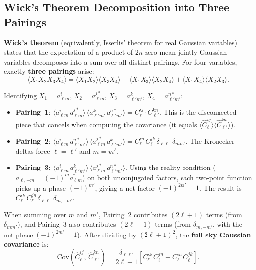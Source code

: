 \documentclass[10pt,a4paper]{article}
\newcommand{\Cl}{C_\ell}
\begin{document}
\subsection{Wick's Theorem Decomposition into Three Pairings}

\textbf{Wick's theorem} (equivalently, Isserlis' theorem for real Gaussian variables) states that the expectation of a product of $2n$ zero-mean jointly Gaussian variables decomposes into a sum over all distinct pairings. For four variables, exactly \textbf{three pairings} arise:
\begin{equation}
\langle X_1 X_2 X_3 X_4 \rangle
= \langle X_1 X_2 \rangle \langle X_3 X_4 \rangle
+ \langle X_1 X_3 \rangle \langle X_2 X_4 \rangle
+ \langle X_1 X_4 \rangle \langle X_2 X_3 \rangle.
\end{equation}

Identifying $X_1 = a_{\ell m}^i$, $X_2 = a_{\ell m}^{j*}$, $X_3 = a_{\ell' m'}^k$, $X_4 = a_{\ell' m'}^{n*}$:

\begin{itemize}[leftmargin=2em]
\item \textbf{Pairing~1}: $\langle a_{\ell m}^i\, a_{\ell m}^{j*}\rangle\, \langle a_{\ell' m'}^k\, a_{\ell' m'}^{n*}\rangle = \Cl^{ij} \cdot C_{\ell'}^{kn}$. This is the disconnected piece that cancels when computing the covariance (it equals $\langle \hat{C}_\ell^{ij}\rangle \langle \hat{C}_{\ell'}^{kn}\rangle$).

\item \textbf{Pairing~2}: $\langle a_{\ell m}^i\, a_{\ell' m'}^{n*}\rangle\, \langle a_{\ell m}^{j*}\, a_{\ell' m'}^k\rangle = \Cl^{in}\, \Cl^{jk}\, \delta_{\ell\ell'}\, \delta_{mm'}$. The Kronecker deltas force $\ell = \ell'$ and $m = m'$.

\item \textbf{Pairing~3}: $\langle a_{\ell m}^i\, a_{\ell' m'}^k\rangle\, \langle a_{\ell m}^{j*}\, a_{\ell' m'}^{n*}\rangle$. Using the reality condition ($a_{\ell,-m} = (-1)^m a_{\ell m}^*$) on both unconjugated factors, each two-point function picks up a phase $(-1)^{m'}$, giving a net factor $(-1)^{2m'} = 1$. The result is $\Cl^{ik}\, \Cl^{jn}\, \delta_{\ell\ell'}\, \delta_{m,-m'}$.
\end{itemize}

When summing over $m$ and $m'$, Pairing~2 contributes $(2\ell+1)$ terms (from $\delta_{mm'}$), and Pairing~3 also contributes $(2\ell+1)$ terms (from $\delta_{m,-m'}$, with the net phase $(-1)^{2m'} = 1$). After dividing by $(2\ell+1)^2$, the \textbf{full-sky Gaussian covariance} is:
\begin{equation}
\boxed{
\mathrm{Cov}\!\left(\hat{C}_\ell^{ij},\, \hat{C}_{\ell'}^{kn}\right)
= \frac{\delta_{\ell\ell'}}{2\ell+1}
\left[ \Cl^{ik}\, \Cl^{jn} + \Cl^{in}\, \Cl^{jk} \right].
}
\label{eq:gaussian_cov_fullsky}
\end{equation}
\end{document}
